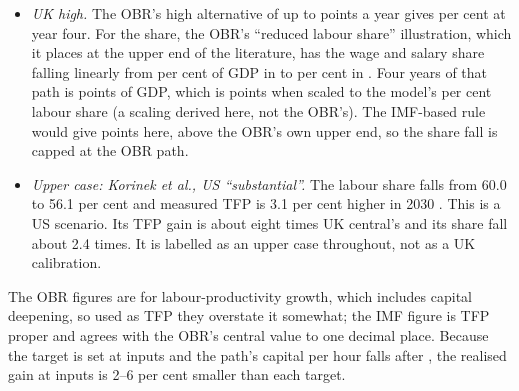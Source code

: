 \begin{itemize}
\item \emph{UK high.} The OBR's high alternative of up to \genUkHighObrBoostPp{} points a year gives \genUkHighTfpPct{} per cent at year four. For the share, the OBR's ``reduced labour share'' illustration, which it places at the upper end of the literature, has the wage and salary share falling linearly from \genObrWageShareStartPct{} per cent of GDP in \genObrWageShareStartFy{} to \genObrWageShareEndPct{} per cent in \genObrWageShareEndFy{} \citep[Box~4.1]{obr2026frs}. Four years of that path is \genObrWageShareFourYearPp{} points of GDP, which is \genObrWageShareScaledPp{} points when scaled to the model's \genLabourShareBase{} per cent labour share (a scaling derived here, not the OBR's). The IMF-based rule would give \genUkHighShareFromTfpPp{} points here, above the OBR's own upper end, so the share fall is capped at the OBR path.
\item \emph{Upper case: Korinek et al., US ``substantial''.} The labour share falls from 60.0 to 56.1 per cent and measured TFP is 3.1 per cent higher in 2030 \citep[Table~3]{korinek2026}. This is a US scenario. Its TFP gain is about eight times UK central's and its share fall about 2.4 times. It is labelled as an upper case throughout, not as a UK calibration.
\end{itemize}
The OBR figures are for labour-productivity growth, which includes capital deepening, so used as TFP they overstate it somewhat; the IMF figure is TFP proper and agrees with the OBR's central value to one decimal place. Because the target is set at \genRampZeroYear{} inputs and the path's capital per hour falls after \genRampZeroYear{}, the realised gain at \genHeadYear{} inputs is 2--6 per cent smaller than each target.

